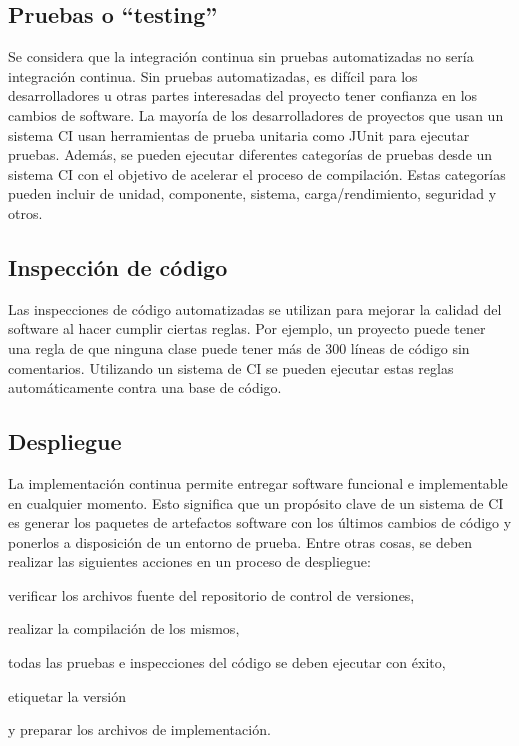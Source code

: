\subsection{Pruebas o “testing”}
Se considera que la integración continua sin pruebas automatizadas no sería integración continua. Sin pruebas automatizadas, es difícil para los desarrolladores u otras partes interesadas del proyecto tener confianza en los cambios de software. La mayoría de los desarrolladores de proyectos que usan un sistema CI usan herramientas de prueba unitaria como JUnit para ejecutar pruebas. Además, se pueden ejecutar diferentes categorías de pruebas desde un sistema CI con el objetivo de acelerar el proceso de compilación. Estas categorías pueden incluir de unidad, componente, sistema, carga/rendimiento, seguridad y otros.

\subsection{Inspección de código}
Las inspecciones de código automatizadas se utilizan para mejorar la calidad del software al hacer cumplir ciertas reglas. Por ejemplo, un proyecto puede tener una regla de que ninguna clase puede tener más de 300 líneas de código sin comentarios. Utilizando un sistema de CI se pueden ejecutar estas reglas automáticamente contra una base de código.

\subsection{Despliegue}
La implementación continua permite entregar software funcional e implementable en cualquier momento. Esto significa que un propósito clave de un sistema de CI es generar los paquetes de artefactos software con los últimos cambios de código y ponerlos a disposición de un entorno de prueba. Entre otras cosas, se deben realizar las siguientes acciones en un proceso de despliegue:
\begin{compactitem}
    \item verificar los archivos fuente del repositorio de control de versiones, 
    \item realizar la compilación de los mismos, 
    \item todas las pruebas e inspecciones del código se deben ejecutar con éxito,
    \item etiquetar la versión
    \item y preparar los archivos de implementación.
\end{compactitem}

